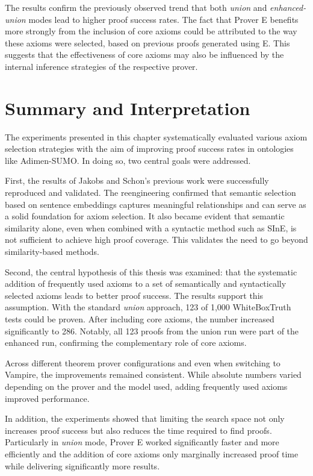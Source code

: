 \documentclass[english,version-2020-11]{uzl-thesis}
\begin{document}
The results confirm the previously observed trend that both \textit{union} and \textit{enhanced-union} modes lead to higher proof success rates. The fact that Prover E benefits more strongly from the inclusion of core axioms could be attributed to the way these axioms were selected, based on previous proofs generated using E. This suggests that the effectiveness of core axioms may also be influenced by the internal inference strategies of the respective prover.

\section{Summary and Interpretation}

The experiments presented in this chapter systematically evaluated various axiom selection strategies with the aim of improving proof success rates in ontologies like Adimen-SUMO. In doing so, two central goals were addressed.

First, the results of Jakobs and Schon's previous work were successfully reproduced and validated. The reengineering confirmed that semantic selection based on sentence embeddings captures meaningful relationships and can serve as a solid foundation for axiom selection. It also became evident that semantic similarity alone, even when combined with a syntactic method such as SInE, is not sufficient to achieve high proof coverage. This validates the need to go beyond similarity-based methods.

Second, the central hypothesis of this thesis was examined: that the systematic addition of frequently used axioms to a set of semantically and syntactically selected axioms leads to better proof success. The results support this assumption. With the standard \textit{union} approach, 123 of 1,000 WhiteBoxTruth tests could be proven. After including core axioms, the number increased significantly to 286. Notably, all 123 proofs from the union run were part of the enhanced run, confirming the complementary role of core axioms.

Across different theorem prover configurations and even when switching to Vampire, the improvements remained consistent. While absolute numbers varied depending on the prover and the model used, adding frequently used axioms improved performance.

In addition, the experiments showed that limiting the search space not only increases proof success but also reduces the time required to find proofs. Particularly in \textit{union} mode, Prover E worked significantly faster and more efficiently and the addition of core axioms only marginally increased proof time while delivering significantly more results.
\end{document}
